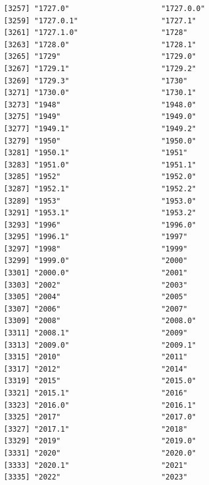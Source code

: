 \documentclass[
  letterpaper,
  DIV=11,
  numbers=noendperiod]{scrreprt}
\begin{document}
\begin{verbatim}
[3257] "1727.0"                     "1727.0.0"                  
[3259] "1727.0.1"                   "1727.1"                    
[3261] "1727.1.0"                   "1728"                      
[3263] "1728.0"                     "1728.1"                    
[3265] "1729"                       "1729.0"                    
[3267] "1729.1"                     "1729.2"                    
[3269] "1729.3"                     "1730"                      
[3271] "1730.0"                     "1730.1"                    
[3273] "1948"                       "1948.0"                    
[3275] "1949"                       "1949.0"                    
[3277] "1949.1"                     "1949.2"                    
[3279] "1950"                       "1950.0"                    
[3281] "1950.1"                     "1951"                      
[3283] "1951.0"                     "1951.1"                    
[3285] "1952"                       "1952.0"                    
[3287] "1952.1"                     "1952.2"                    
[3289] "1953"                       "1953.0"                    
[3291] "1953.1"                     "1953.2"                    
[3293] "1996"                       "1996.0"                    
[3295] "1996.1"                     "1997"                      
[3297] "1998"                       "1999"                      
[3299] "1999.0"                     "2000"                      
[3301] "2000.0"                     "2001"                      
[3303] "2002"                       "2003"                      
[3305] "2004"                       "2005"                      
[3307] "2006"                       "2007"                      
[3309] "2008"                       "2008.0"                    
[3311] "2008.1"                     "2009"                      
[3313] "2009.0"                     "2009.1"                    
[3315] "2010"                       "2011"                      
[3317] "2012"                       "2014"                      
[3319] "2015"                       "2015.0"                    
[3321] "2015.1"                     "2016"                      
[3323] "2016.0"                     "2016.1"                    
[3325] "2017"                       "2017.0"                    
[3327] "2017.1"                     "2018"                      
[3329] "2019"                       "2019.0"                    
[3331] "2020"                       "2020.0"                    
[3333] "2020.1"                     "2021"                      
[3335] "2022"                       "2023"                      

\end{verbatim}
\end{document}
